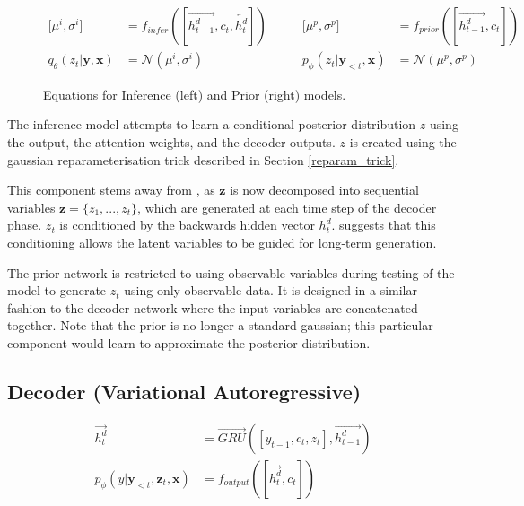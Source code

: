 \documentclass[12pt,twoside]{report}
\begin{document}
\begin{figure}[!ht]
	\label{eqn:inf_prior}
	\begin{equation}
		\begin{split}
			\lbrack \mu^i, \sigma^i \rbrack &=
			f_{infer}([\overrightarrow{h^d_{t-1}}, c_t, \overleftarrow{h^d_t}])
			\\
			q_{\theta}(z_t|\boldsymbol{y}, \boldsymbol{x}) &= \mathcal{N}(\mu^i, \sigma^i)
		\end{split}
		\quad\quad
		\begin{split}
			\lbrack \mu^p, \sigma^p \rbrack &=
			f_{prior}([\overrightarrow{h^d_{t-1}}, c_t])
			\\
			p_{\phi}(z_t|\boldsymbol{y}_{<t}, \boldsymbol{x}) &= \mathcal{N}(\mu^p, \sigma^p)
		\end{split}
	\end{equation}
	\caption{Equations for Inference (left) and Prior (right) models.}
	\end{figure}

The inference model attempts to learn a conditional posterior distribution $z$ using the output, the attention weights, and the decoder outputs. $z$ is created using the gaussian reparameterisation trick described in Section \ref{reparam_trick}.

This component stems away from \cite{zhao_learning_2017}, as $\boldsymbol{z}$ is now decomposed into sequential variables $\boldsymbol{z} = \{z_1,...,z_t\}$, which are generated at each time step of the decoder phase. $z_t$ is conditioned by the backwards hidden vector $h^d_{t}$. \cite{du_variational_2018} suggests that this conditioning allows the latent variables to be guided for long-term generation.

The prior network is restricted to using observable variables during testing of the model to generate $z_t$ using only observable data. It is designed in a similar fashion to the decoder network where the input variables are concatenated together. Note that the prior is no longer a standard gaussian; this particular component would learn to approximate the posterior distribution.

\subsection{Decoder (Variational Autoregressive)}

\begin{equation}
	\begin{split}
		\overrightarrow{h^d_t} &= \overrightarrow{GRU}([y_{t-1},c_t,z_t], \overrightarrow{h^d_{t-1}}) \\
		p_\phi(y|\boldsymbol{y}_{<t},\boldsymbol{z}_t, \boldsymbol{x}) &= f_{output}([\overrightarrow{h^d_t}, c_t])
	\end{split}
\end{equation}
\end{document}
